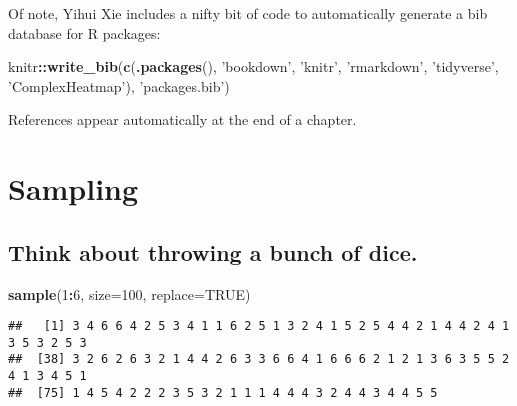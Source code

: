 \documentclass[]{book}
\newenvironment{Shaded}{\begin{snugshade}}{\end{snugshade}}
\newcommand{\DataTypeTok}[1]{\textcolor[rgb]{0.13,0.29,0.53}{#1}}
\newcommand{\DecValTok}[1]{\textcolor[rgb]{0.00,0.00,0.81}{#1}}
\newcommand{\KeywordTok}[1]{\textcolor[rgb]{0.13,0.29,0.53}{\textbf{#1}}}
\newcommand{\NormalTok}[1]{#1}
\newcommand{\OperatorTok}[1]{\textcolor[rgb]{0.81,0.36,0.00}{\textbf{#1}}}
\newcommand{\OtherTok}[1]{\textcolor[rgb]{0.56,0.35,0.01}{#1}}
\newcommand{\StringTok}[1]{\textcolor[rgb]{0.31,0.60,0.02}{#1}}
\begin{document}
Of note, Yihui Xie includes a nifty bit of code to automatically generate a bib database for R packages:

\begin{Shaded}
\begin{Highlighting}[]
\NormalTok{knitr}\OperatorTok{::}\KeywordTok{write_bib}\NormalTok{(}\KeywordTok{c}\NormalTok{(}\KeywordTok{.packages}\NormalTok{(), }\StringTok{'bookdown'}\NormalTok{, }\StringTok{'knitr'}\NormalTok{, }\StringTok{'rmarkdown'}\NormalTok{, }\StringTok{'tidyverse'}\NormalTok{, }\StringTok{'ComplexHeatmap'}\NormalTok{), }\StringTok{'packages.bib'}\NormalTok{)}
\end{Highlighting}
\end{Shaded}

References appear automatically at the end of a chapter.

\hypertarget{sampling}{%
\chapter{Sampling}\label{sampling}}

\hypertarget{think-about-throwing-a-bunch-of-dice.}{%
\section{Think about throwing a bunch of dice.}\label{think-about-throwing-a-bunch-of-dice.}}

\begin{Shaded}
\begin{Highlighting}[]
\KeywordTok{sample}\NormalTok{(}\DecValTok{1}\OperatorTok{:}\DecValTok{6}\NormalTok{, }\DataTypeTok{size=}\DecValTok{100}\NormalTok{, }\DataTypeTok{replace=}\OtherTok{TRUE}\NormalTok{) }
\end{Highlighting}
\end{Shaded}

\begin{verbatim}
##   [1] 3 4 6 6 4 2 5 3 4 1 1 6 2 5 1 3 2 4 1 5 2 5 4 4 2 1 4 4 2 4 1 3 5 3 2 5 3
##  [38] 3 2 6 2 6 3 2 1 4 4 2 6 3 3 6 6 4 1 6 6 6 2 1 2 1 3 6 3 5 5 2 4 1 3 4 5 1
##  [75] 1 4 5 4 2 2 2 3 5 3 2 1 1 1 4 4 4 3 2 4 4 3 4 4 5 5
\end{verbatim}

\begin{Shaded}
\end{Shaded}
\end{document}
